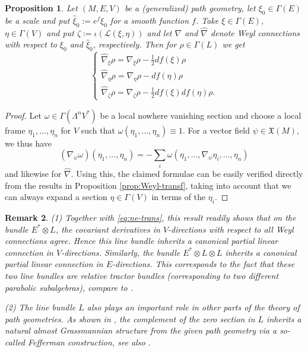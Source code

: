 \documentclass[11pt]{amsart}
\newtheorem{proposition}{Proposition}
\newtheorem{remark}[proposition]{Remark}
\numberwithin{proposition}{section}
\numberwithin{equation}{section}
\begin{document}
\begin{proposition}\label{prop:L-trans}
    Let $(M,E,V)$ be a (generalized) path geometry, let $\xi_0\in\Gamma(E)$ be a scale and put $\hat\xi_0:=e^f\xi_0$ for a smooth function $f$. Take $\xi\in\Gamma(E)$, $\eta\in\Gamma(V)$ and put $\zeta:=\iota(\mathcal L (\xi,\eta))$ and let $\nabla$ and $\hat\nabla$ denote Weyl connections with respect to $\xi_0$ and $\hat\xi_0$, respectively. Then for $\rho\in\Gamma(L)$ we get 
    \begin{equation}\label{n-trans-L}
        \begin{cases}
            \hat\nabla_\xi \rho=\nabla_\xi\rho -\tfrac12 df(\xi)\rho\\
            \hat\nabla_{\eta}\rho=\nabla_{\eta}\rho-df(\eta)\rho\\
            \hat\nabla_{\zeta}\rho=\nabla_{\zeta}\rho-\frac12df(\xi)df(\eta)\rho. 
        \end{cases} 
    \end{equation} 
\end{proposition}
\begin{proof}
   Let $\omega\in\Gamma(\Lambda^n V^*)$ be a local nowhere vanishing section and choose a local frame $\eta_1,\dots,\eta_n$ for $V$ such that $\omega(\eta_1,\dots,\eta_n)\equiv 1$. For a vector field $\psi\in\mathfrak X(M)$, we thus have 
   $$(\nabla_{\psi}\omega)(\eta_1,\dots,\eta_n)=-\textstyle\sum_i\omega(\eta_1,\dots,\nabla_\psi\eta_i,\dots,\eta_n)$$ 
   and likewise for $\hat\nabla$. Using this, the claimed formulae can be easily verified directly from the results in Proposition \ref{prop:Weyl-transf}, taking into account that we can always expand a section $\eta\in\Gamma(V)$ in terms of the $\eta_i$.  
\end{proof}

\begin{remark}
(1) Together with \eqref{eq:ne-trans}, this result readily shows that on the bundle $E^*\otimes L$, the covariant derivatives in $V$-directions with respect to all Weyl connections agree. Hence this line bundle inherits a canonical partial linear connection in $V$-directions. Similarly, the bundle $E^*\otimes L\otimes L$ inherits a canonical partial linear connection in $E$-directions. This corresponds to the fact that these two line bundles are relative tractor bundles (corresponding to two different parabolic subalgebras), compare to \cite{Relative}. 

(2) The line bundle $L$ also plays an important role in other parts of the theory of path geometries. As shown in \cite{Guo_Fef}, the complement of the zero section in $L$ inherits a natural almost Grassmannian structure from the given path geometry via a so-called Fefferman construction, see also \cite{Crampin-Saunders}.   
\end{remark}
\end{document}
